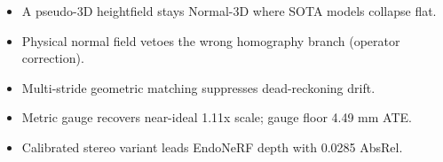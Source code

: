 \begin{itemize}
\item A pseudo-3D heightfield stays Normal-3D where SOTA models collapse flat.
\item Physical normal field vetoes the wrong homography branch (operator correction).
\item Multi-stride geometric matching suppresses dead-reckoning drift.
\item Metric gauge recovers near-ideal 1.11x scale; gauge floor 4.49 mm ATE.
\item Calibrated stereo variant leads EndoNeRF depth with 0.0285 AbsRel.
\end{itemize}
